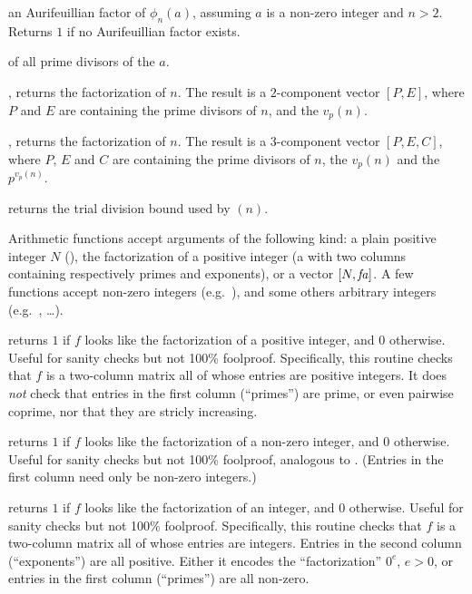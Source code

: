  an Aurifeuillian factor of
$\phi_n(a)$, assuming $a$ is a non-zero integer and $n > 2$. Returns $1$
if no Aurifeuillian factor exists.

  of all prime divisors of the
 $a$.

, returns the factorization of $n$. The result
is a $2$-component vector $[P,E]$, where $P$ and $E$ are 
containing the prime divisors of $n$, and the $v_p(n)$.

, returns the factorization of $n$. The result
is a $3$-component vector $[P,E,C]$, where $P$, $E$ and $C$ are
 containing the prime divisors of $n$, the $v_p(n)$
and the $p^{v_p(n)}$.

 returns the trial division bound used by
$(n)$.


Arithmetic functions accept arguments of the following kind: a plain positive
integer $N$ (), the factorization  of a positive integer (a
 with two columns containing respectively primes and exponents), or
a vector $[N,\hbox{\it fa\/}]$. A few functions accept non-zero
integers (e.g.~), and some others arbitrary integers
(e.g.~, \dots).

 returns $1$ if $f$ looks like the
factorization of a positive integer, and $0$ otherwise. Useful for sanity
checks but not 100\% foolproof. Specifically, this routine checks that $f$ is
a two-column matrix all of whose entries are positive integers. It does
\emph{not} check that entries in the first column (``primes'') are prime,
or even pairwise coprime, nor that they are stricly increasing.

 returns $1$ if $f$ looks like the
factorization of a non-zero integer, and $0$ otherwise. Useful for sanity
checks but not 100\% foolproof, analogous to . (Entries
in the first column need only be non-zero integers.)

 returns $1$ if $f$ looks like the
factorization of an integer, and $0$ otherwise. Useful for sanity
checks but not 100\% foolproof. Specifically, this routine checks that $f$ is
a two-column matrix all of whose entries are integers. Entries in the second
column (``exponents'') are all positive. Either it encodes the
``factorization'' $0^e$, $e > 0$, or entries in the first column (``primes'')
are all non-zero.

